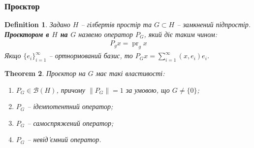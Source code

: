 \documentclass[a4paper, 10pt]{article}
\theoremstyle{theoremdd}
\newtheorem{theorem}{Theorem}[subsection]
\theoremstyle{theoremdd}
\newtheorem{definition}[theorem]{Definition}
\theoremstyle{theoremdd}
\theoremstyle{theoremdd}
\theoremstyle{theoremdd}
\theoremstyle{theoremdd}
\theoremstyle{theoremdd}
\theoremstyle{theoremdd}
\DeclareMathOperator{\pr}{pr}
\begin{document}
\subsubsection{Проєктор}
\begin{definition}
Задано $H$ -- гілбертів простір та $G \subset H$ -- замкнений підпростір.\\
\textbf{Проєктором в $H$ на $G$} назвемо оператор $P_G$, який діє таким чином:
\begin{align*}
P_g x = \pr_g x
\end{align*}
Якщо $\{e_i\}_{i=1}^\infty$ -- ортнормований базис, то $P_G x = \displaystyle\sum_{i=1}^\infty (x,e_i)e_i$.
\end{definition}

\begin{theorem}
Проєктор на $G$ має такі властивості:
\begin{enumerate}[nosep,wide=0pt,label={\arabic*)}]
\item $P_G \in \mathcal{B}(H)$, причому $\|P_G\| = 1$ за умовою, що $G \neq \{0\}$;
\item $P_G$ -- ідемпотентний оператор;
\item $P_G$ -- самоспряжений оператор;
\item $P_G$ -- невід'ємний оператор.
\end{enumerate}
\end{theorem}
\end{document}
